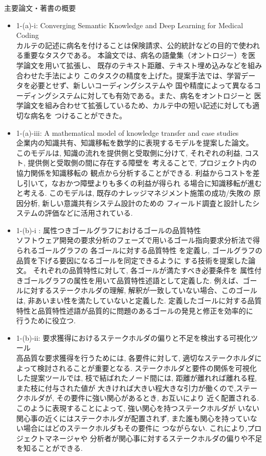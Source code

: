 \documentclass[dvipdfmx]{jlreq}
\begin{document}
\item 主要論文・著書の概要
\begin{itemize}
\item 1-(a)-i: Converging Semantic Knowledge and Deep Learning for Medical Coding\\
カルテの記述に病名を付けることは保険請求、公的統計などの目的で使われる重要なタスクである。
本論文では、病名の語彙集（オントロジー）を医学論文を用いて拡張し、
既存のテキスト距離、テキスト埋め込みなどを組み合わせた手法により
このタスクの精度を上げた。提案手法では、学習データを必要とせず、新しいコーディングシステムや
国や精度によって異なるコーディングシステムに対しても有効である。また、病名をオントロジーと
医学論文を組み合わせて拡張しているため、カルテ中の短い記述に対しても適切な病名を
つけることができた。

\item 1-(a)-iii: A mathematical model of knowledge transfer and case studies\\
企業内の知識共有、知識移転を数学的に表現するモデルを提案した論文。
このモデルは, 知識の流れを提供側と受取側に分けて,
それぞれの利益, コスト, 提供側と受取側の間に存在する障壁を
考えることで, プロジェクト内の協力関係を知識移転の
観点から分析することができる.
利益からコストを差し引いて，なおかつ障壁よりも多くの利益が得られ
る場合に知識移転が進むと考える.
このモデルは, 既存のナレッジマネジメント施策の成功/失敗の
原因分析, 新しい意識共有システム設計のための
フィールド調査と設計したシステムの評価などに活用されている.

\item 1-(b)-i : 属性つきゴールグラフにおけるゴールの品質特性\\
ソフトウェア開発の要求分析のフェーズで用いるゴール指向要求分析法で得られるゴールグラフの
各ゴールに対する品質特性
を定義し, ゴールグラフの品質を下げる要因になるゴールを同定できるように
する技術を提案した論文。
それぞれの品質特性に対して, 各ゴールが満たすべき必要条件を
属性付きゴールグラフの属性を用いて品質特性述語として定義した.
例えば、ゴールに対するステークホルダの理解, 解釈が一致していない場合、このゴール
は, 非あいまい性を満たしていないと定義した.
定義したゴールに対する品質特性と品質特性述語が品質的に問題のあるゴールの発見と修正を効率的に
行うために役立つ.
\item 1-(b)-ii: 要求獲得におけるステークホルダの偏りと不足を検出する可視化ツール\\
高品質な要求獲得を行うためには, 各要件に対して, 適切なステークホルダによって検討されることが重要となる.
ステークホルダと要件の関係を可視化した提案ツールでは,
枝で結ばれたノード間には, 距離が離れれば離れる程, また枝に付与された値が
大きければ大きい程大きな引力が働くので,ステークホルダが, その要件に強い関心があるとき, お互いにより
近く配置される. このように表現することによって, 強い関心を持つステークホルダが
いない関心事の近くにはステークホルダが配置されず,
また誰も関心を持っていない場合にはどのステークホルダもその要件に
つながらない. これにより,プロジェクトマネージャや
分析者が関心事に対するステークホルダの偏りや不足を知ることができる.


\end{itemize}
\end{document}
